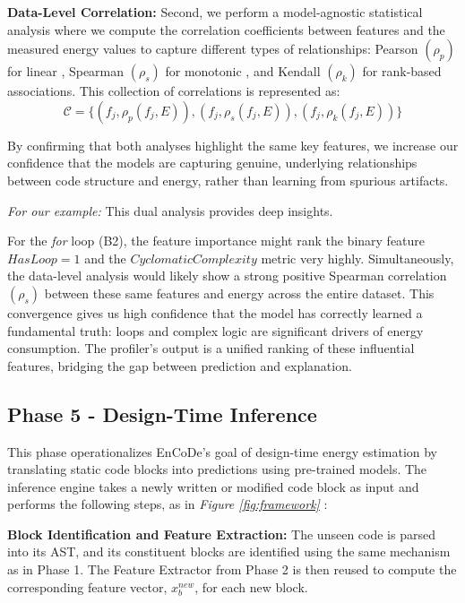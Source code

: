 \noindent
\textbf{Data-Level Correlation:} Second, we perform a model-agnostic statistical analysis where we compute the correlation coefficients between  features and the measured energy values to capture different types of relationships: Pearson \((\rho_p)\) for linear \cite{1896RSPTA.187..253P}, Spearman \((\rho_s)\) for monotonic \cite{spearman04}, and Kendall \((\rho_k)\) for rank-based associations\cite{665905b2-6123-3642-832e-05dbc1f48979}. This collection of correlations is represented as:
\[ \mathcal{C} = \{ (f_j, \rho_p(f_j, E)), (f_j, \rho_s(f_j, E)), (f_j, \rho_k(f_j, E)) \} \]

\noindent
By confirming that both analyses highlight the same key features, we increase our confidence that the models are capturing genuine, underlying relationships between code structure and energy, rather than learning from spurious artifacts.

\noindent
\textit{For our example:} This dual analysis provides deep insights.


\noindent
For the \textit{for} loop (B2), the feature importance might rank the binary feature \(HasLoop=1\) and the \(CyclomaticComplexity\) metric very highly.
\noindent
Simultaneously, the data-level analysis would likely show a strong positive Spearman correlation \((\rho_s)\) between these same features and energy across the entire dataset.
\noindent
This convergence gives us high confidence that the model has correctly learned a fundamental truth: loops and complex logic are significant drivers of energy consumption. The profiler's output is a unified ranking of these influential features, bridging the gap between prediction and explanation.

\subsection{Phase 5 - Design-Time Inference}
\noindent
This phase operationalizes EnCoDe's goal of design-time energy estimation by translating static code blocks into predictions using pre-trained models.
\noindent
The inference engine takes a newly written or modified code block as input and performs the following steps, as in \textit{Figure \ref{fig:framework}} :

    
\noindent
\textbf{Block Identification and Feature Extraction:} The unseen code is parsed into its AST, and its constituent blocks are identified using the same mechanism as in Phase 1. The Feature Extractor from Phase 2 is then reused to compute the corresponding feature vector, \(x_b^{new}\), for each new block.


